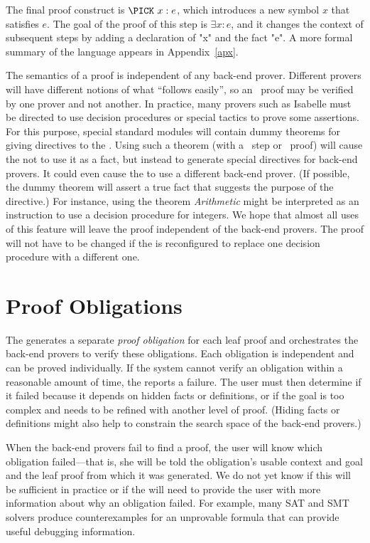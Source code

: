\documentclass[a4paper]{easychair}
\begin{document}
The final \tlatwo proof construct is $\PICK\ x : e$, which introduces
a new symbol $x$ that satisfies $e$.  The goal of the proof of this
\PICK step is $\exists x : e$, and it changes the context of
subsequent steps by adding a declaration of "x" and the fact "e". 
A more formal summary of the language appears in Appendix~\ref{apx}.

The semantics of a \tlatwo proof is independent of any back-end
prover. Different provers will have different notions of what
``follows easily'', so an \OBVIOUS\ proof may be verified by one
prover and not another.  In practice, many provers such as Isabelle
must be directed to use decision procedures or special tactics to
prove some assertions.  For this purpose, special standard modules
will contain dummy theorems for giving directives to the
\PM.  Using such a theorem (with a \USE\ step or \BY\ proof) will
cause the \PM not to use it as a fact, but instead to generate
special directives for back-end provers.  It could even cause the \PM
to use a different back-end prover.  (If possible, the dummy theorem
will assert a true fact that suggests the purpose of the directive.)
\ednote{}{}For instance, using the theorem \emph{Arithmetic}
might be interpreted as an instruction to use a decision procedure for
integers.
We hope that almost all uses of this feature will leave the \tlatwo
proof independent of the back-end provers.  The proof will not have
to be changed if the \PM is reconfigured to replace one decision
procedure with a different one.

\section{Proof Obligations}
\label{sec:obligations}

The \PM generates a separate \textit{proof obligation} for each leaf
proof and orchestrates the back-end provers to verify these
obligations.  Each obligation is independent and can be proved
individually.  If the system cannot verify an obligation within a
reasonable amount of time, the \PM reports a failure.  The user must
then determine if it failed because it depends on hidden facts or
definitions, or if the goal is too complex and needs to be refined
with another level of proof.  (Hiding facts or definitions might also
help to constrain the search space of the back-end provers.)

When the back-end provers fail to find a proof, the user will know
which obligation failed---that is, she will be told the
obligation's usable context and goal and the leaf proof from which it
was generated.  We do not yet know if this will be sufficient in
practice or if the \PM will need to provide the user with more
information about why an obligation failed.  For example, many SAT and
SMT solvers produce counterexamples for an unprovable formula that
can provide useful debugging information.
\end{document}
